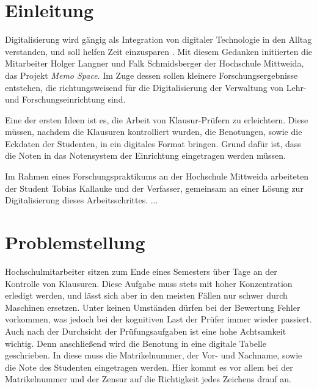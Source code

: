 \documentclass[nomenclature, draft, 150]{HSMW-Thesis}
\begin{document}
\begin{Referat}
\end{Referat}


\Hauptteil

\chapter{Einleitung}
	Digitalisierung wird gängig als Integration von digitaler Technologie in den Alltag verstanden, und soll helfen Zeit einzusparen \cite{digital}. Mit diesem Gedanken initiierten die Mitarbeiter Holger Langner und Falk Schmidsberger der Hochschule Mittweida, das Projekt \textit{Memo Space}. Im Zuge dessen sollen kleinere Forschungsergebnisse entstehen, die richtungsweisend für die Digitalisierung der Verwaltung von Lehr- und Forschungseinrichtung sind.

	Eine der ersten Ideen  ist es, die Arbeit von Klausur-Prüfern zu erleichtern. Diese müssen, nachdem die Klausuren kontrolliert wurden, die Benotungen, sowie die Eckdaten der Studenten, in ein digitales Format bringen. Grund dafür ist, dass die Noten in das Notensystem der Einrichtung eingetragen werden müssen. 

	Im Rahmen eines Forschungspraktikums an der Hochschule Mittweida arbeiteten der Student Tobias Kallauke und der Verfasser, gemeinsam an einer Lösung zur Digitalisierung dieses Arbeitsschrittes. ...

\chapter{Problemstellung} 
	Hochschulmitarbeiter sitzen zum Ende eines Semesters über Tage an der Kontrolle von Klausuren. Diese Aufgabe muss stets mit hoher Konzentration erledigt werden, und lässt sich aber in den meisten Fällen nur schwer durch Maschinen ersetzen. Unter keinen Umständen dürfen bei der Bewertung Fehler vorkommen, was jedoch bei der kognitiven Last der Prüfer immer wieder passiert. Auch nach der Durchsicht der Prüfungsaufgaben ist eine hohe Achtsamkeit wichtig. Denn anschließend wird die Benotung in eine digitale Tabelle geschrieben. In diese muss die Matrikelnummer, der Vor- und Nachname, sowie die Note des Studenten eingetragen werden. Hier kommt es vor allem bei der Matrikelnummer und der Zensur auf die Richtigkeit jedes Zeichens drauf an. 
	
\end{document}
